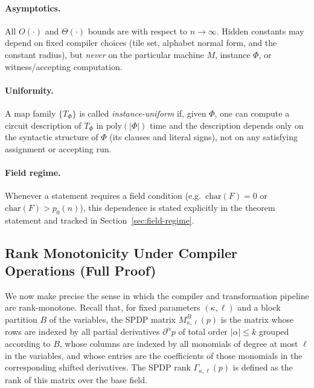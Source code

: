 \documentclass[12pt]{article}
\newcommand{\poly}{\mathrm{poly}}
\theoremstyle{definition}
\theoremstyle{definition}
\theoremstyle{remark}
\theoremstyle{remark}
\begin{document}
\paragraph{Asymptotics.}
All $O(\cdot)$ and $\Theta(\cdot)$ bounds are with respect to $n\to\infty$.
Hidden constants may depend on fixed compiler choices (tile set, alphabet
normal form, and the constant radius), but \emph{never} on the particular
machine $M$, instance $\Phi$, or witness/accepting computation.

\paragraph{Uniformity.}
A map family $\{T_{\Phi}\}$ is called \emph{instance-uniform} if, given $\Phi$,
one can compute a circuit description of $T_{\Phi}$ in $\poly(|\Phi|)$ time and
the description depends only on the syntactic structure of $\Phi$
(its clauses and literal signs), not on any satisfying assignment or accepting run.

\paragraph{Field regime.}
Whenever a statement requires a field condition (e.g.\ $\mathrm{char}(F)=0$ or
$\mathrm{char}(F)>p_0(n)$), this dependence is stated explicitly in the theorem
statement and tracked in Section~\ref{sec:field-regime}.

\subsection{Rank Monotonicity Under Compiler Operations (Full Proof)}
\label{sec:rank-monotonicity-operations}

We now make precise the sense in which the compiler and transformation
pipeline are rank-monotone. Recall that, for fixed parameters $(\kappa,\ell)$
and a block partition $B$ of the variables, the SPDP matrix
$M^{B}_{\kappa,\ell}(p)$ is the matrix whose rows are indexed by all partial
derivatives $\partial^\alpha p$ of total order $|\alpha|\le k$ grouped
according to $B$, whose columns are indexed by all monomials of degree at
most $\ell$ in the variables, and whose entries are the coefficients of
those monomials in the corresponding shifted derivatives. The SPDP rank
$\Gamma_{\kappa,\ell}(p)$ is defined as the rank of this matrix over the base
field.
\end{document}
